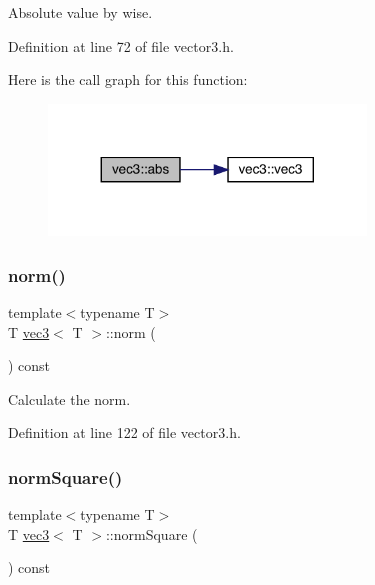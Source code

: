 Absolute value by wise. 



Definition at line 72 of file vector3.\+h.

Here is the call graph for this function\+:\nopagebreak
\begin{figure}[H]
\begin{center}
\leavevmode
\includegraphics[width=239pt]{structvec3_abf0d30ac0a81beeacd36ddc86ec6ee83_cgraph}
\end{center}
\end{figure}
\mbox{\label{structvec3_a1bde56ffdf0b5915f9b2e75b56db63e8}} 
\subsubsection{\texorpdfstring{norm()}{norm()}}
{\footnotesize\ttfamily template$<$typename T$>$ \\
T \mbox{\hyperlink{structvec3}{vec3}}$<$ T $>$\+::norm (\begin{DoxyParamCaption}{ }\end{DoxyParamCaption}) const\hspace{0.3cm}{\ttfamily [inline]}}



Calculate the norm. 



Definition at line 122 of file vector3.\+h.

\mbox{\label{structvec3_ab08eac50c74f6630a05a7fafed13dccc}} 
\subsubsection{\texorpdfstring{norm\+Square()}{normSquare()}}
{\footnotesize\ttfamily template$<$typename T$>$ \\
T \mbox{\hyperlink{structvec3}{vec3}}$<$ T $>$\+::norm\+Square (\begin{DoxyParamCaption}{ }\end{DoxyParamCaption}) const\hspace{0.3cm}{\ttfamily [inline]}}



